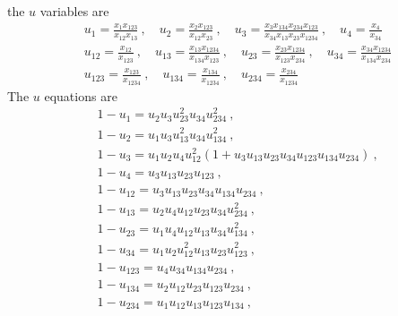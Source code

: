 \documentclass[hidelinks,12pt]{article}
\begin{document}
the $u$ variables are 
\begin{align}
   &u_{1}=\frac{x_{1}x_{123}}{x_{12}x_{13}} \:, \quad  u_{2}=\frac{x_{2}x_{123}}{x_{12}x_{23}} \:,  \quad 
   u_{3}=\frac{x_{3}x_{134}x_{234}x_{123}}{x_{34}x_{13}x_{23}x_{1234}} \:, \quad 
   u_{4}=\frac{x_{4}}{x_{34}} \\
   &u_{12}=\frac{x_{12}}{x_{123}} \:, \quad u_{13}=\frac{x_{13}x_{1234}}{x_{134}x_{123}} \:,\quad 
   u_{23}=\frac{x_{23}x_{1234}}{x_{123}x_{234}} \:, \quad u_{34}=\frac{x_{34}x_{1234}}{x_{134}x_{234}} \\
   &u_{123}=\frac{x_{123}}{x_{1234}} \:, \quad u_{134}=\frac{x_{134}}{x_{1234}} \:, \quad 
   u_{234}=\frac{x_{234}}{x_{1234}}
\end{align}
The $u$ equations are
\begin{align}
   &1-u_{1}=u_{2}u_{3}u_{23}^{2}u_{34}u_{234}^{2} \:, \\
   &1-u_{2}=u_{1}u_{3}u_{13}^{2}u_{34}u_{134}^{2} \:, \\
   &1-u_{3}= u_{1}u_{2}u_{4}u_{12}^{2}(1+u_{3}u_{13}u_{23}u_{34}u_{123}u_{134}u_{234}) \:, \\
   &1-u_{4}=u_{3}u_{13}u_{23}u_{123}  \:, \\
   &1-u_{12} =u_{3}u_{13}u_{23}u_{34}u_{134}u_{234} \:, \\
   &1-u_{13} =u_{2}u_{4}u_{12}u_{23}u_{34}u_{234}^{2} \:, \\
   &1-u_{23}= u_{1}u_{4}u_{12}u_{13}u_{34}u_{134}^{2} \:, \\
   &1-u_{34}= u_{1}u_{2}u_{12}^{2}u_{13}u_{23}u_{123}^{2} \:, \\
   &1-u_{123}=u_{4}u_{34}u_{134}u_{234} \:, \\
   &1-u_{134}=u_{2}u_{12}u_{23}u_{123}u_{234} \:, \\
   &1-u_{234}=u_{1}u_{12}u_{13}u_{123}u_{134} \:, 
\end{align} 
\end{document}
